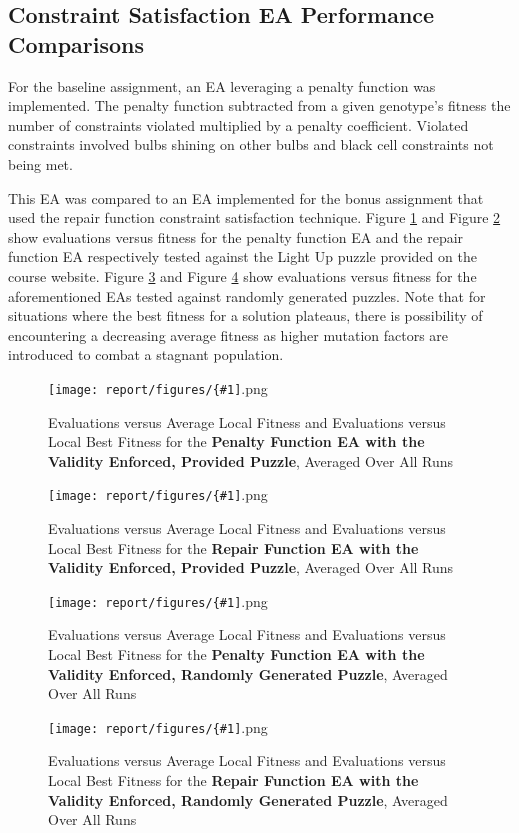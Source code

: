\documentclass[11pt]{article}
\newcommand{\fitnessplotcaption}[1]{\caption{Evaluations versus Average Local Fitness and Evaluations versus 
    Local Best Fitness for the \textbf{{#1}}, Averaged Over All Runs}}
\newcommand{\addgraphic}[1]{\centerline{\texttt{[image: report/figures/\{\#1]}.png}}}
\begin{document}
\subsection{Constraint Satisfaction EA Performance Comparisons}

For the baseline assignment, an EA leveraging a penalty function was implemented. The penalty function
subtracted from a given genotype's fitness the number of constraints violated multiplied by a
penalty coefficient. Violated constraints involved bulbs shining on other bulbs and black cell
constraints not being met.

This EA was compared to an EA implemented for the bonus assignment that used the repair function
constraint satisfaction technique. Figure \ref{fig:website_puzzle_validity_enforced_graph} and Figure 
\ref{fig:website_puzzle_validity_enforced_bonus_graph} show evaluations versus fitness for the 
penalty function EA and the repair function EA respectively tested against the Light Up puzzle provided
on the course website. Figure \ref{fig:random_gen_validity_enforced_graph} and Figure \ref{fig:random_gen_validity_enforced_bonus_graph} 
show evaluations versus fitness for the aforementioned EAs tested against randomly generated puzzles. Note that 
for situations where the best fitness for a solution plateaus, there is possibility of encountering a decreasing average fitness
as higher mutation factors are introduced to combat a stagnant population.

\begin{figure}[H]
    \addgraphic{website_puzzle_validity_enforced_graph}
    \fitnessplotcaption{Penalty Function EA with the Validity Enforced, Provided Puzzle}
    \label{fig:website_puzzle_validity_enforced_graph}
\end{figure}

\begin{figure}[H]
    \addgraphic{website_puzzle_validity_enforced_bonus_graph}
    \fitnessplotcaption{Repair Function EA with the Validity Enforced, Provided Puzzle}
    \label{fig:website_puzzle_validity_enforced_bonus_graph}
\end{figure}

\begin{figure}[H]
    \addgraphic{random_gen_validity_enforced_graph}
    \fitnessplotcaption{Penalty Function EA with the Validity Enforced, Randomly Generated Puzzle}
    \label{fig:random_gen_validity_enforced_graph}
\end{figure}

\begin{figure}[H]
    \addgraphic{random_gen_validity_enforced_bonus_graph}
    \fitnessplotcaption{Repair Function EA with the Validity Enforced, Randomly Generated Puzzle}
    \label{fig:random_gen_validity_enforced_bonus_graph}
\end{figure}
\end{document}
